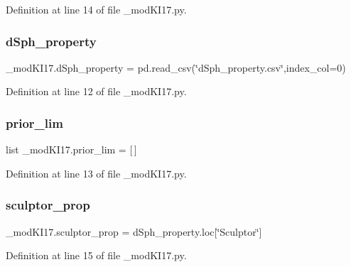 Definition at line 14 of file \+\_\+mod\+K\+I17.\+py.

\mbox{\label{namespace__modKI17_a1dc0b70b70de3db7377d1a3a6f92871a}} 
\subsubsection{\texorpdfstring{d\+Sph\+\_\+property}{dSph\_property}}
{\footnotesize\ttfamily \+\_\+mod\+K\+I17.\+d\+Sph\+\_\+property = pd.\+read\+\_\+csv(\char`\"{}d\+Sph\+\_\+property.\+csv\char`\"{},index\+\_\+col=0)}



Definition at line 12 of file \+\_\+mod\+K\+I17.\+py.

\mbox{\label{namespace__modKI17_a41888ff5544dc7ffbf48470ca2274d5d}} 
\subsubsection{\texorpdfstring{prior\+\_\+lim}{prior\_lim}}
{\footnotesize\ttfamily list \+\_\+mod\+K\+I17.\+prior\+\_\+lim = \mbox{[}$\,$\mbox{]}}



Definition at line 13 of file \+\_\+mod\+K\+I17.\+py.

\mbox{\label{namespace__modKI17_a1230991826227dbc38455a1297294f77}} 
\subsubsection{\texorpdfstring{sculptor\+\_\+prop}{sculptor\_prop}}
{\footnotesize\ttfamily \+\_\+mod\+K\+I17.\+sculptor\+\_\+prop = d\+Sph\+\_\+property.\+loc\mbox{[}\char`\"{}Sculptor\char`\"{}\mbox{]}}



Definition at line 15 of file \+\_\+mod\+K\+I17.\+py.

